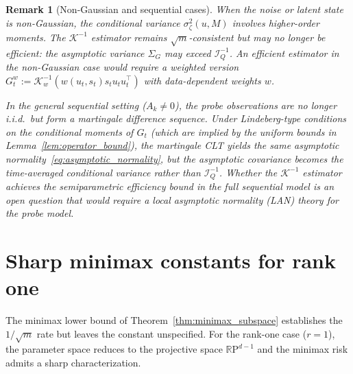 \documentclass[12pt]{article}
\newcommand{\R}{\mathbb{R}}
\newtheorem{remark}{Remark}
\theoremstyle{plain}
\theoremstyle{definition}
\begin{document}
\begin{remark}[Non-Gaussian and sequential cases]
\label{rem:non_gaussian_case}
When the noise or latent state is non-Gaussian, the conditional variance $\sigma_\zeta^2(u, M)$ involves higher-order moments. The $\mathcal{K}^{-1}$ estimator remains $\sqrt{m}$-consistent but may no longer be efficient: the asymptotic variance $\Sigma_G$ may exceed $\mathcal{I}_Q^{-1}$. An efficient estimator in the non-Gaussian case would require a weighted version $G_t^w := \mathcal{K}_w^{-1}(w(u_t, s_t) s_t u_t u_t^\top)$ with data-dependent weights $w$.

In the general sequential setting ($A_k \neq 0$), the probe observations are no longer i.i.d.\ but form a martingale difference sequence. Under Lindeberg-type conditions on the conditional moments of $G_t$ (which are implied by the uniform bounds in Lemma~\ref{lem:operator_bound}), the martingale CLT \citep[Theorem~3.2]{hall1980martingale} yields the same asymptotic normality~\eqref{eq:asymptotic_normality}, but the asymptotic covariance becomes the time-averaged conditional variance rather than $\mathcal{I}_Q^{-1}$. Whether the $\mathcal{K}^{-1}$ estimator achieves the semiparametric efficiency bound in the full sequential model is an open question that would require a local asymptotic normality (LAN) theory for the probe model.
\end{remark}


\section{Sharp minimax constants for rank one}
\label{sec:sharp_constants}

The minimax lower bound of Theorem~\ref{thm:minimax_subspace} establishes the $1/\sqrt{m}$ rate but leaves the constant unspecified. For the rank-one case ($r = 1$), the parameter space reduces to the projective space $\R\mathrm{P}^{d-1}$ and the minimax risk admits a sharp characterization.
\end{document}
